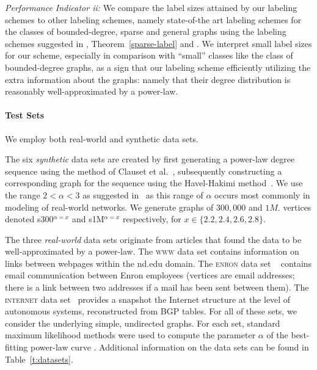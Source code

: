 \emph{Performance Indicator ii:} We  compare the label sizes attained by our labeling schemes to other labeling schemes, namely state-of-the art labeling schemes for the classes of bounded-degree, sparse and general graphs using the  labeling schemes suggested in \cite{adjiashvili2014labeling},  Theorem~\ref{sparse-label} and \cite{alstrup2014adjacency}.  We interpret small label sizes for our scheme, especially in comparison with ``small'' classes like the class of bounded-degree graphs, as a sign that our labeling scheme efficiently utilizing  the extra information about the graphs: namely that their degree distribution is reasonably well-approximated by a power-law.



 

\paragraph{Test Sets}
We employ both real-world and synthetic data sets. 

The six \emph{synthetic} data sets are created by first generating a power-law degree sequence using the method of Clauset et al.~\cite[App.\ D]{clauset2009power}, subsequently constructing a corresponding graph for the sequence using the Havel-Hakimi method~\cite{hakimi1962realizability}. 
We use the range $2< \alpha < 3$ as suggested in~\cite{clauset2009power} as this range of $\alpha$ occurs most commonly in modeling of real-world networks. We generate graphs of $300,000$ and $1M.$ vertices denoted  s300$^{\alpha=x}$  and s1M$^{\alpha=x}$  respectively, for $x \in \{2.2,2.4,2.6,2.8\}$. 


The three \emph{real-world} data sets originate  from articles that found the data to be well-approximated by a power-law. 
The \textsc{www} data set  \cite{albert1999internet} contains information on links between webpages within the nd.edu domain. 
The \textsc{enron} data set ~\cite{leskovec2009community}  contains email communication between  Enron employees (vertices are email addresses; there is a link between two addresses
if a mail has been sent between them).
The \textsc{internet} data set~\cite{newman} provides a snapshot the Internet structure at the level of  autonomous systems, reconstructed from BGP tables. 
For all of these sets, we consider the underlying simple, undirected graphs. For each set, standard maximum likelihood methods were used to compute the parameter
$\alpha$ of the best-fitting power-law curve \cite{clauset2009power}. Additional information on the data sets can be found in Table~\ref{t:datasets}.

